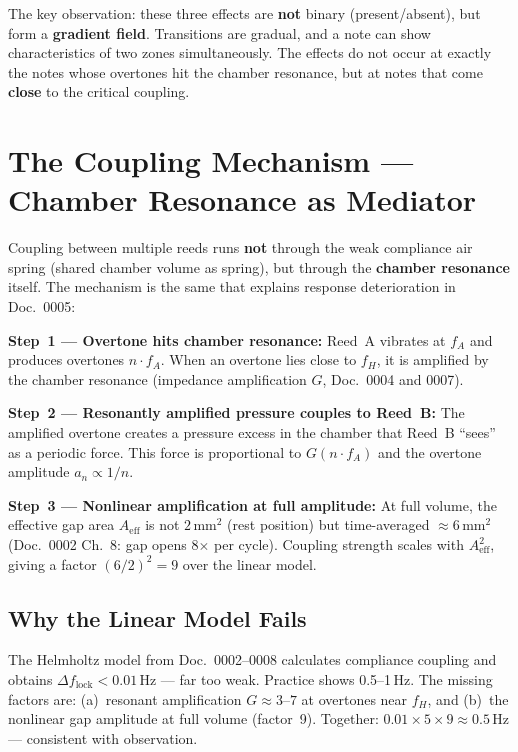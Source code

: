 \documentclass[11pt,a4paper]{article}
\begin{document}
The key observation: these three effects are \textbf{not} binary (present/absent), but form a \textbf{gradient field}. Transitions are gradual, and a note can show characteristics of two zones simultaneously. The effects do not occur at exactly the notes whose overtones hit the chamber resonance, but at notes that come \textbf{close} to the critical coupling.

\section{The Coupling Mechanism --- Chamber Resonance as Mediator}

Coupling between multiple reeds runs \textbf{not} through the weak compliance air spring (shared chamber volume as spring), but through the \textbf{chamber resonance} itself. The mechanism is the same that explains response deterioration in Doc.~0005:

\textbf{Step~1 --- Overtone hits chamber resonance:} Reed~A vibrates at $f_A$ and produces overtones $n \cdot f_A$. When an overtone lies close to $f_H$, it is amplified by the chamber resonance (impedance amplification $G$, Doc.~0004 and 0007).

\textbf{Step~2 --- Resonantly amplified pressure couples to Reed~B:} The amplified overtone creates a pressure excess in the chamber that Reed~B ``sees'' as a periodic force. This force is proportional to $G(n \cdot f_A)$ and the overtone amplitude $a_n \propto 1/n$.

\textbf{Step~3 --- Nonlinear amplification at full amplitude:} At full volume, the effective gap area $A_\text{eff}$ is not $2\,\text{mm}^2$ (rest position) but time-averaged $\approx 6\,\text{mm}^2$ (Doc.~0002 Ch.~8: gap opens 8$\times$ per cycle). Coupling strength scales with $A_\text{eff}^2$, giving a factor $(6/2)^2 = 9$ over the linear model.

\subsection{Why the Linear Model Fails}

The Helmholtz model from Doc.~0002--0008 calculates compliance coupling and obtains $\Delta f_\text{lock} < 0{.}01$\,Hz --- far too weak. Practice shows 0.5--1\,Hz. The missing factors are: (a)~resonant amplification $G \approx 3$--$7$ at overtones near $f_H$, and (b)~the nonlinear gap amplitude at full volume (factor~9). Together: $0{.}01 \times 5 \times 9 \approx 0{.}5$\,Hz --- consistent with observation.
\end{document}
